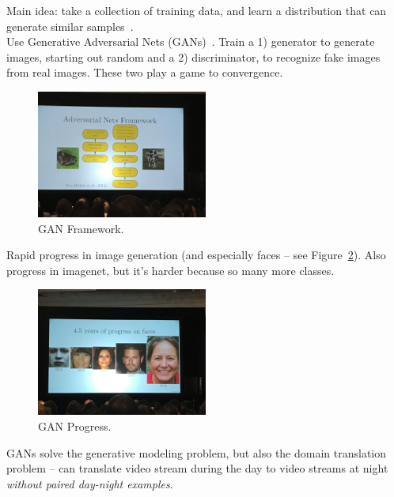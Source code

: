 Main idea: take a collection of training data, and learn a distribution that can generate similar samples~\cite{karras2017progressive}. \\

Use Generative Adversarial Nets (GANs)~\cite{goodfellow2014generative}. Train a 1) generator to generate images, starting out random and a 2) discriminator, to recognize fake images from real images. These two play a game to convergence.

\begin{figure}[h!]
    \centering
    \includegraphics[width=0.5\textwidth]{images/gans.JPG}
    \caption{GAN Framework.}
    \label{fig:gan}
\end{figure}

Rapid progress in image generation (and especially faces -- see Figure~\ref{fig:gan_prog}). Also progress in imagenet, but it's harder because so many more classes. \\


\begin{figure}[h!]
    \centering
    \includegraphics[width=0.5\textwidth]{images/gan_progress.JPG}
    \caption{GAN Progress.}
    \label{fig:gan_prog}
\end{figure}


GANs solve the generative modeling problem, but also the domain translation problem -- can translate video stream during the day to video streams at night {\it without paired day-night examples}. \\

